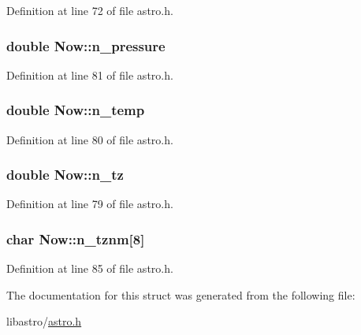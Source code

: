 Definition at line 72 of file astro.\-h.

\hypertarget{struct_now_a53069a0946078dc8e2c74a24253d486a}{
\subsubsection[{n\-\_\-pressure}]{\setlength{\rightskip}{0pt plus 5cm}double Now\-::n\-\_\-pressure}}\label{struct_now_a53069a0946078dc8e2c74a24253d486a}


Definition at line 81 of file astro.\-h.

\hypertarget{struct_now_ab415bd78ad14170324c47fc33e6f20f7}{
\subsubsection[{n\-\_\-temp}]{\setlength{\rightskip}{0pt plus 5cm}double Now\-::n\-\_\-temp}}\label{struct_now_ab415bd78ad14170324c47fc33e6f20f7}


Definition at line 80 of file astro.\-h.

\hypertarget{struct_now_a383e1839a265aa16a9559da5b6e7e466}{
\subsubsection[{n\-\_\-tz}]{\setlength{\rightskip}{0pt plus 5cm}double Now\-::n\-\_\-tz}}\label{struct_now_a383e1839a265aa16a9559da5b6e7e466}


Definition at line 79 of file astro.\-h.

\hypertarget{struct_now_a4de7465879314c2183d60680531d7f8e}{
\subsubsection[{n\-\_\-tznm}]{\setlength{\rightskip}{0pt plus 5cm}char Now\-::n\-\_\-tznm\mbox{[}8\mbox{]}}}\label{struct_now_a4de7465879314c2183d60680531d7f8e}


Definition at line 85 of file astro.\-h.



The documentation for this struct was generated from the following file\-:\begin{DoxyCompactItemize}
\item 
libastro/\hyperlink{astro_8h}{astro.\-h}\end{DoxyCompactItemize}
